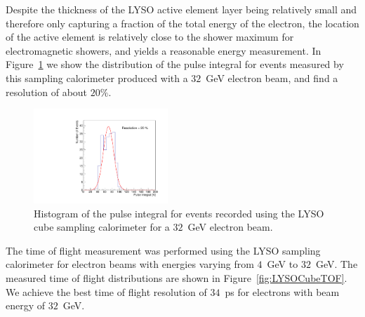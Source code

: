 \documentclass[12pt]{article}
\begin{document}
Despite the thickness of the LYSO active element layer being relatively
small and therefore only capturing a fraction of the total energy
of the electron, the location of the active element is relatively close to the
shower maximum for electromagnetic showers, and yields
a reasonable energy measurement. In Figure~\ref{fig:LYSOCubeEnergy32GeV}
we show the distribution of the pulse integral for events
measured by this sampling calorimeter produced with a
$32$~GeV electron beam, and find a resolution of about $20\%$.


\begin{figure}[h] \centering
\includegraphics[width=0.45\textwidth]{figs/TOF_Electron_LYSOCube_32GeV_energy} 
\caption{ Histogram of the pulse integral for events recorded using
the LYSO cube sampling calorimeter for a $32$~GeV electron beam. } 
\label{fig:LYSOCubeEnergy32GeV}
\end{figure}

The time of flight measurement was performed using the LYSO sampling calorimeter
for electron beams with energies varying from $4$~GeV to $32$~GeV. The 
measured time of flight distributions are shown in Figure~\ref{fig:LYSOCubeTOF}.
We achieve the best time of flight resolution of $34$~ps for electrons
with beam energy of $32$~GeV.
\end{document}
